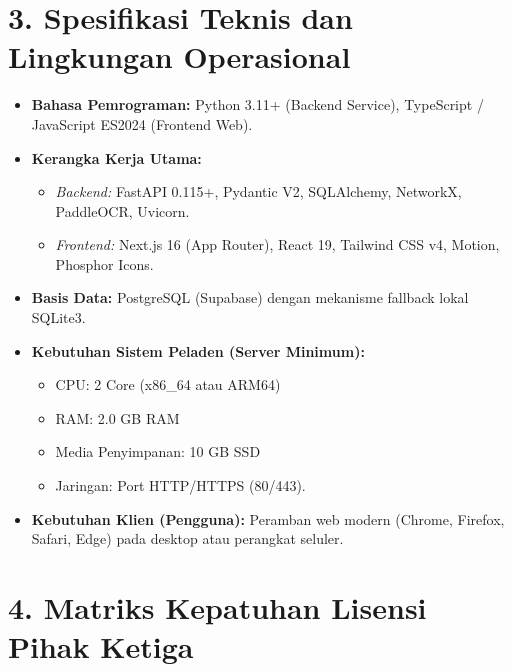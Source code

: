 \documentclass[11pt,a4paper]{article}
\begin{document}
\newpage

\section*{3. Spesifikasi Teknis dan Lingkungan Operasional}

\begin{itemize}
    \item \textbf{Bahasa Pemrograman:} Python 3.11+ (Backend Service), TypeScript / JavaScript ES2024 (Frontend Web).
    \item \textbf{Kerangka Kerja Utama:}
    \begin{itemize}
        \item \textit{Backend:} FastAPI 0.115+, Pydantic V2, SQLAlchemy, NetworkX, PaddleOCR, Uvicorn.
        \item \textit{Frontend:} Next.js 16 (App Router), React 19, Tailwind CSS v4, Motion, Phosphor Icons.
    \end{itemize}
    \item \textbf{Basis Data:} PostgreSQL (Supabase) dengan mekanisme fallback lokal SQLite3.
    \item \textbf{Kebutuhan Sistem Peladen (Server Minimum):}
    \begin{itemize}
        \item CPU: 2 Core (x86\_64 atau ARM64)
        \item RAM: 2.0 GB RAM
        \item Media Penyimpanan: 10 GB SSD
        \item Jaringan: Port HTTP/HTTPS (80/443).
    \end{itemize}
    \item \textbf{Kebutuhan Klien (Pengguna):} Peramban web modern (Chrome, Firefox, Safari, Edge) pada desktop atau perangkat seluler.
\end{itemize}

\vspace{0.8em}
\section*{4. Matriks Kepatuhan Lisensi Pihak Ketiga}
\end{document}
